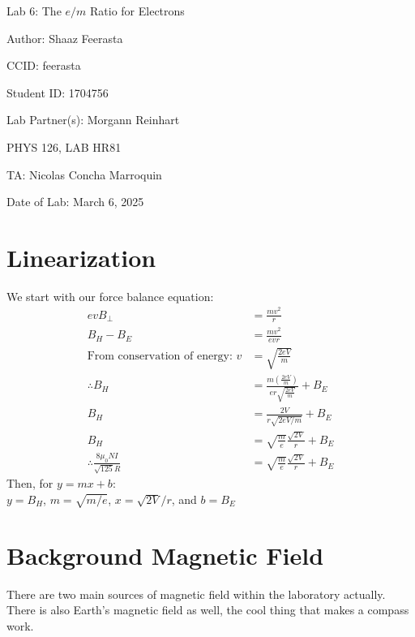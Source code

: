 \documentclass[12pt]{article}
\begin{document}
\pagebreak
\begin{titlepage}
    \begin{center}
        \vspace*{\fill}
        Lab 6: The $e/m$ Ratio for Electrons

        Author: Shaaz Feerasta

        CCID: feerasta

        Student ID: 1704756

        Lab Partner(s): Morgann Reinhart

        PHYS 126, LAB HR81

        TA: Nicolas Concha Marroquin

        Date of Lab: March 6, 2025
        \vspace*{\fill}
    \end{center}
\end{titlepage}

\section{Linearization}
We start with our force balance equation:
\begin{align*}
    evB_{\perp} &= \frac{mv^2}{r} \\
    B_H - B_E &= \frac{mv^2}{evr} \\
    \text{From conservation of energy: } v &= \sqrt{\frac{2eV}{m}} \\
    \therefore B_H &= \frac{m\left(\frac{2eV}{m}\right)}{er\sqrt{\frac{2eV}{m}}} + B_E \\
    B_H &= \frac{2V}{r\sqrt{2eV/m}} + B_E\\
    B_H &= \sqrt{\frac{m}{e}}\frac{\sqrt{2V}}{r} + B_E \\
    \therefore \frac{8\mu_0NI}{\sqrt{125}R} &= \sqrt{\frac{m}{e}}\frac{\sqrt{2V}}{r} + B_E
\end{align*}
Then, for $y = mx + b$: \\
$y = B_H$, $m = \sqrt{m/e}$, $x = \sqrt{2V}/r$, and $b = B_E$

\section{Background Magnetic Field}
There are two main sources of magnetic field within the laboratory actually. There is also Earth's magnetic field as well,
the cool thing that makes a compass work.
\end{document}
